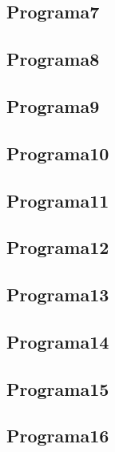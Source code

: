 \documentclass{article}
\begin{document}
\subsection{Programa7}

\newpage

\subsection{Programa8}

\newpage

\subsection{Programa9}

\newpage

\subsection{Programa10}

\newpage

\subsection{Programa11}

\newpage

\subsection{Programa12}

\newpage

\subsection{Programa13}

\newpage

\subsection{Programa14}

\newpage

\subsection{Programa15}

\newpage

\subsection{Programa16}

\newpage
\end{document}
